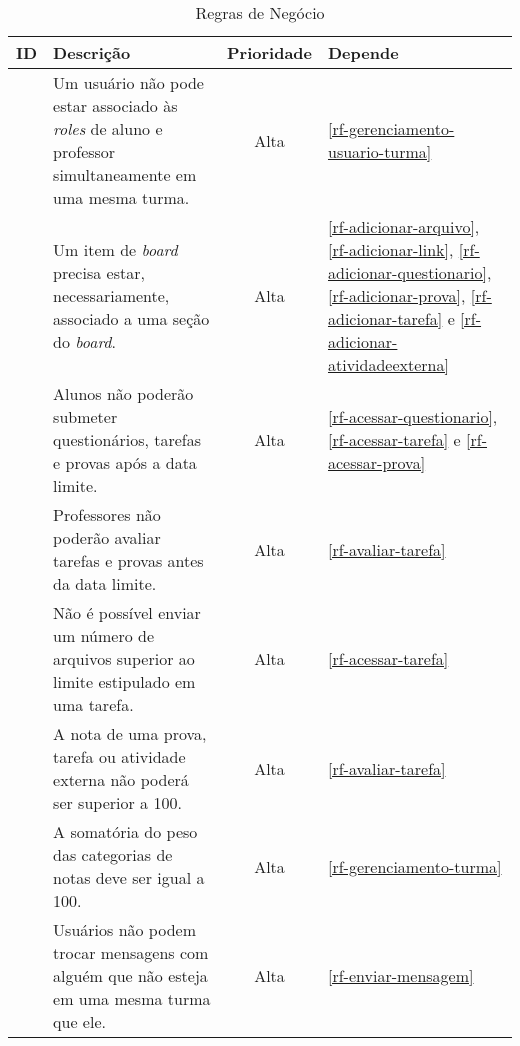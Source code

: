 \begin{longtable}{|c|p{10cm}|c|p{2cm}|}
	
	\caption{Regras de Negócio} \\ \hline \rowcolor[rgb]{0.8,0.8,0.8}
	
	ID & 	Descrição  &  Prioridade    & Depende  \\ \hline	
	
	\RN\label{rn-roles}  & Um usuário não pode estar associado às \textit{roles} de aluno e professor simultaneamente em uma mesma turma. & Alta & \ref{rf-gerenciamento-usuario-turma}  \\ \hline 
	
	\RN\label{rn-item-secao}  & Um item de \textit{board} precisa estar, necessariamente, associado a uma seção do \textit{board}. & Alta &  \ref{rf-adicionar-arquivo}, \ref{rf-adicionar-link}, \ref{rf-adicionar-questionario}, \ref{rf-adicionar-prova}, \ref{rf-adicionar-tarefa} e \ref{rf-adicionar-atividadeexterna} \\ \hline
	
	\RN\label{rn-submeter} & Alunos não poderão submeter questionários, tarefas e provas após a data limite. & Alta & \ref{rf-acessar-questionario}, \ref{rf-acessar-tarefa} e \ref{rf-acessar-prova} \\ \hline	

	\RN\label{rn-avaliar} & Professores não poderão avaliar tarefas e provas antes da data limite. & Alta & \ref{rf-avaliar-tarefa} \\ \hline	
	
	\RN\label{rn-limite-arquivos} & Não é possível enviar um número de arquivos superior ao limite estipulado em uma tarefa. & Alta & \ref{rf-acessar-tarefa} \\ \hline
	
	\RN\label{rn-nota} & A nota de uma prova, tarefa ou atividade externa não poderá ser superior a 100. & Alta & \ref{rf-avaliar-tarefa} \\ \hline
	
	\RN\label{rn-peso} & A somatória do peso das categorias de notas deve ser igual a 100. & Alta & \ref{rf-gerenciamento-turma} \\ \hline

	\RN\label{rn-mensagem} & Usuários não podem trocar mensagens com alguém que não esteja em uma mesma turma que ele. & Alta & \ref{rf-enviar-mensagem} \\ \hline

\end{longtable}

